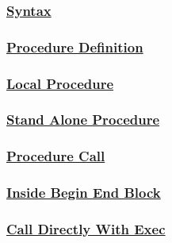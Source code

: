 \subsubsection*{\underline{Syntax}}

\subsubsection*{\underline{Procedure Definition}}

\subsubsection*{\underline{Local Procedure}}





\subsubsection*{\underline{Stand Alone Procedure}}



\newpage
\subsubsection*{\underline{Procedure Call}}

\subsubsection*{\underline{Inside Begin End Block}}



\subsubsection*{\underline{Call Directly With Exec}}




